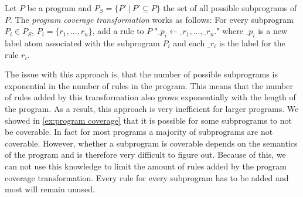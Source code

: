 \begin{definition}
\label{def:program transformation}
    Let $P$ be a program and \(P_S = \{P'\ |\ P' \subseteq P\}\) the set of all possible subprograms of $P$. The \emph{program coverage transformation} works as follows: For every subprogram \(P_i \in P_S\), \(P_i = \{r_1, \ldots, r_n\}\), add a rule to $P$ "\(\_p_i \leftarrow \_r_1, \ldots, \_r_n.\)" where $\_p_i$ is a new label atom associated with the subprogram $P_i$ and each $\_r_i$ is the label for the rule $r_i$.
\end{definition}

The issue with this approach is, that the number of possible subprograms is exponential in the number of rules in the program. This means that the number of rules added by this transformation also grows exponentially with the length of the program. As a result, this approach is very inefficient for larger programs. We showed in \cref{ex:program coverage} that it is possible for some subprograms to not be coverable. In fact for most programs a majority of subprograms are not coverable. However, whether a subprogram is coverable depends on the semantics of the program and is therefore very difficult to figure out. Because of this, we can not use this knowledge to limit the amount of rules added by the program coverage transformation. Every rule for every subprogram has to be added and most will remain unused.

